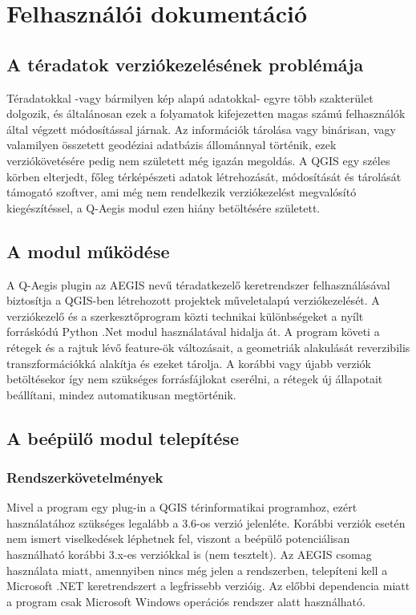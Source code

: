 \chapter{Felhasználói dokumentáció}
\label{ch:user}
\section{A téradatok verziókezelésének problémája}
Téradatokkal -vagy bármilyen kép alapú adatokkal- egyre több szakterület dolgozik, és általánosan ezek a folyamatok kifejezetten magas számú felhasználók által végzett módosítással járnak. Az információk tárolása vagy binárisan, vagy valamilyen összetett geodéziai adatbázis állománnyal történik, ezek verziókövetésére pedig nem született még igazán megoldás. A QGIS egy széles körben elterjedt, főleg térképészeti adatok létrehozását, módosítását és tárolását támogató szoftver, ami még nem rendelkezik verziókezelést megvalósító kiegészítéssel, a Q-Aegis modul ezen hiány betöltésére született.
\section{A modul működése}
A Q-Aegis plugin az AEGIS nevű téradatkezelő keretrendszer felhasználásával biztosítja a QGIS-ben létrehozott projektek műveletalapú verziókezelését. A verziókezelő és a szerkesztőprogram közti technikai különbségeket a nyílt forráskódú Python .Net modul használatával hidalja át. A program követi a rétegek és a rajtuk lévő feature-ök változásait, a geometriák alakulását reverzibilis transzformációkká alakítja és ezeket tárolja. A korábbi vagy újabb verziók betöltésekor így nem szükséges forrásfájlokat cserélni, a rétegek új állapotait beállítani, mindez automatikusan megtörténik. 

\section{A beépülő modul telepítése}
\subsection{Rendszerkövetelmények}
Mivel a program egy plug-in a QGIS térinformatikai programhoz, ezért használatához szükséges legalább a 3.6-os verzió jelenléte. Korábbi verziók esetén nem ismert viselkedések léphetnek fel, viszont a beépülő potenciálisan használható korábbi 3.x-es verziókkal is (nem tesztelt). Az AEGIS csomag használata miatt, amennyiben nincs még jelen a rendszerben, telepíteni kell a Microsoft .NET keretrendszert a legfrissebb verzióig. Az előbbi dependencia miatt a program csak Microsoft Windows operációs rendszer alatt használható.
